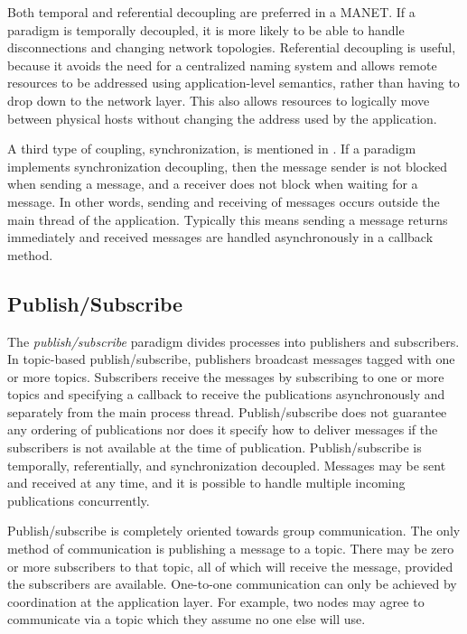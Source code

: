 Both temporal and referential decoupling are preferred in a MANET. If a paradigm is temporally decoupled, it is more likely to be able to handle disconnections and changing network topologies. Referential decoupling is useful, because it avoids the need for a centralized naming system and allows remote resources to be addressed using application-level semantics, rather than having to drop down to the network layer. This also allows resources to logically move between physical hosts without changing the address used by the application.

A third type of coupling, synchronization, is mentioned in \cite{psfaces}. If a paradigm implements synchronization decoupling, then the message sender is not blocked when sending a message, and a receiver does not block when waiting for a message. In other words, sending and receiving of messages occurs outside the main thread of the application. Typically this means sending a message returns immediately and received messages are handled asynchronously in a callback method.

\subsection{Publish/Subscribe}

The \textit{publish/subscribe} paradigm divides processes into publishers and subscribers. In topic-based publish/subscribe, publishers broadcast messages tagged with one or more topics. Subscribers receive the messages by subscribing to one or more topics and specifying a callback to receive the publications asynchronously and separately from the main process thread. Publish/subscribe does not guarantee any ordering of publications nor does it specify how to deliver messages if the subscribers is not available at the time of publication. Publish/subscribe is temporally, referentially, and synchronization decoupled. Messages may be sent and received at any time, and it is possible to handle multiple incoming publications concurrently.

Publish/subscribe is completely oriented towards group communication. The only method of communication is publishing a message to a topic. There may be zero or more subscribers to that topic, all of which will receive the message, provided the subscribers are available. One-to-one communication can only be achieved by coordination at the application layer. For example, two nodes may agree to communicate via a topic which they assume no one else will use.

